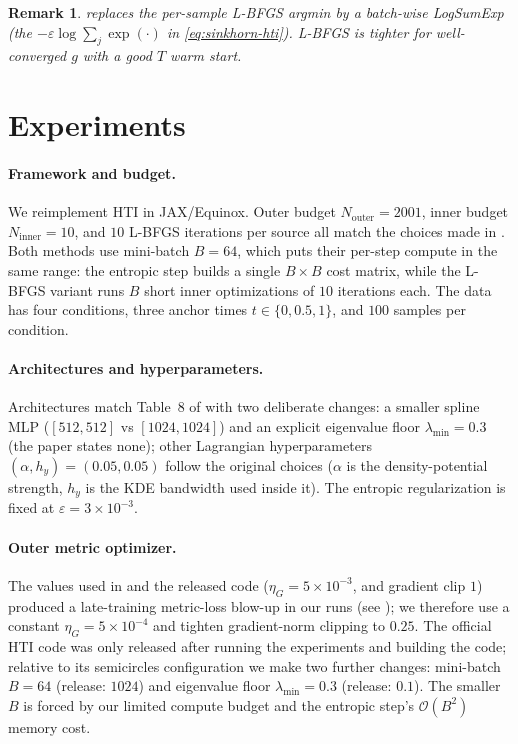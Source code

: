 \documentclass[11pt,a4paper]{article}
\newtheorem*{remark}{Remark}
\newcommand{\nOuter}{2001}%
\newcommand{\maxiterLBFGS}{10}%
\begin{document}
\begin{remark}
 replaces the per-sample L-BFGS argmin by a
batch-wise LogSumExp (the $-\varepsilon\log\sum_j\exp(\cdot)$ in
\cref{eq:sinkhorn-hti}). L-BFGS is tighter for well-converged $g$
with a good $T$ warm start.
\end{remark}

\section{Experiments}
\label{sec:experiments}

\paragraph{Framework and budget.}
We reimplement HTI in JAX/Equinox. Outer budget
$N_{\text{outer}}=\nOuter$, inner budget $N_{\text{inner}}=10$, and
$\maxiterLBFGS$ L-BFGS iterations per source all match the choices made in \citet{amad2026hti}. Both methods use mini-batch $B=64$, which puts their per-step
compute in the same range: the entropic step builds a single
$B \times B$ cost matrix, while the L-BFGS variant runs $B$ short
inner optimizations of $\maxiterLBFGS$ iterations each. The data has four conditions, three anchor times
$t\in\{0,0.5,1\}$, and $100$ samples per condition.

\paragraph{Architectures and hyperparameters.}
Architectures match Table~8 of \citet{amad2026hti} with two
deliberate changes: a smaller spline MLP ($[512,512]$ vs $[1024,1024]$)
and
an explicit eigenvalue floor $\lambda_{\min}=0.3$ (the paper states
none); other Lagrangian hyperparameters $(\alpha, h_y)=(0.05, 0.05)$
follow the original choices ($\alpha$ is the density-potential
strength, $h_y$ is the KDE bandwidth used inside it). The entropic regularization is fixed at
$\varepsilon=3\times 10^{-3}$.

\paragraph{Outer metric optimizer.}
The values used in \citet{amad2026hti} and the released code
\citep{amad2026hticode} ($\eta_G=5\times 10^{-3}$, and gradient clip
$1$) produced a late-training metric-loss blow-up in our runs
(see ); we therefore use a constant
$\eta_G=5\times 10^{-4}$ and tighten gradient-norm clipping to $0.25$.
The official HTI code \citep{amad2026hticode} was only released after running the experiments and building the code; relative to its semicircles configuration we
make two further changes: mini-batch $B = 64$ (release: $1024$) and
eigenvalue floor $\lambda_{\min} = 0.3$ (release: $0.1$). The
smaller $B$ is forced by our limited compute budget and the
entropic step's $\mathcal{O}(B^2)$ memory cost.
\end{document}
